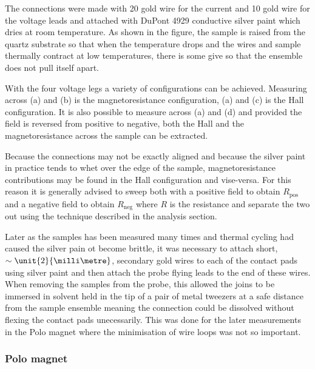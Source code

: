The connections were made with \unit{20}{\micro\metre} gold wire for the current and \unit{10}{\micro\metre} gold wire for the voltage leads and attached with DuPont 4929 conductive silver paint which dries at room temperature. As shown in the figure, the sample is raised from the quartz substrate so that when the temperature drops and the wires and sample thermally contract at low temperatures, there is some give so that the ensemble does not pull itself apart.

With the four voltage legs a variety of configurations can be achieved. Measuring across (a) and (b) is the magnetoresistance configuration, (a) and (c) is the Hall configuration. It is also possible to measure across (a) and (d) and provided the field is reversed from positive to negative, both the Hall and the magnetoresistance across the sample can be extracted.

Because the connections may not be exactly aligned and because the silver paint in practice tends to whet over the edge of the sample, magnetoresistance contributions may be found in the Hall configuration and vise-versa. For this reason it is generally advised to sweep both with a positive field to obtain $R_{\textrm{pos}}$ and a negative field to obtain $R_{\textrm{neg}}$ where $R$ is the resistance and separate the two out using the technique described in the analysis section.

Later as the samples has been measured many times and thermal cycling had caused the silver pain ot become brittle, it was necessary to attach short, $\sim\unit{2}{\milli\metre}$, secondary gold wires to each of the contact pads using silver paint and then attach the probe flying leads to the end of these wires. When removing the samples from the probe, this allowed the joins to be immersed in solvent held in the tip of a pair of metal tweezers at a safe distance from the sample ensemble meaning the connection could be dissolved without flexing the contact pads unecessarily. This was done for the later measurements in the Polo magnet where the minimisation of wire loops was not so important.

\subsubsection{Polo magnet}


